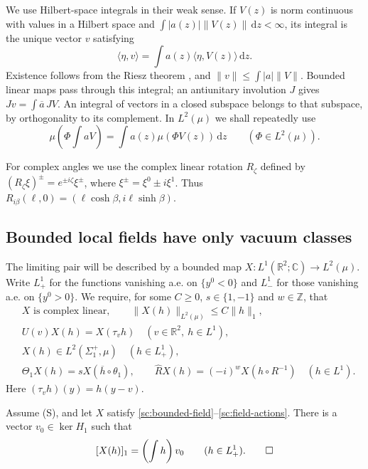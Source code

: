 \documentclass[11pt,letterpaper,reqno]{amsart}
\makeatletter
\theoremstyle{definition}
\newcommand{\ms@minorstart}{%
  \pushQED{\qed}\renewcommand{\qedsymbol}{$\blacksquare$}}
\newenvironment{lemma}[1][]{\ms@minorstart\ms@lemma[#1]}
  {\popQED\endms@lemma}
\theoremstyle{remark}
\newcommand{\R}{\mathbb R}\newcommand{\C}{\mathbb C}
\makeatother
\begin{document}
We use Hilbert-space integrals in their weak sense. If $V(z)$ is norm
continuous with values in a Hilbert space and
$\int|a(z)|\|V(z)\|\,\mathrm dz<\infty$, its integral is the unique vector
$v$ satisfying
\[
\langle\eta,v\rangle=\int a(z)\langle\eta,V(z)\rangle\,\mathrm dz.
\]
Existence follows from the Riesz theorem \cite[Theorem 3.3]{Melrose}, and
$\|v\|\le\int|a|\|V\|$. Bounded linear maps pass through this integral;
an antiunitary involution $J$ gives
$Jv=\int\overline a\,JV$. An integral of vectors in a closed subspace
belongs to that subspace, by orthogonality to its complement. In $L^2(\mu)$
we shall repeatedly use
\begin{equation}\label{sc:integral-pairing}
\mu\left(\Phi\int aV\right)=\int a(z)\mu(\Phi V(z))\,\mathrm dz
\qquad(\Phi\in L^2(\mu)).
\end{equation}

For complex angles we use the complex linear rotation $R_\zeta$ defined by
$(R_\zeta\xi)^\pm=e^{\pm i\zeta}\xi^\pm$, where
$\xi^\pm=\xi^0\pm i\xi^1$. Thus
$R_{i\beta}(\ell,0)=(\ell\cosh\beta,i\ell\sinh\beta)$.

\subsection{Bounded local fields have only vacuum classes}

The limiting pair will be described by a bounded map
$X:L^1(\mathbb R^2;\mathbb C)\to L^2(\mu)$. Write $L^1_+$ for the
functions vanishing a.e. on $\{y^0<0\}$ and $L^1_-$ for those vanishing
a.e. on $\{y^0>0\}$. We require, for some $C\ge0$,
$s\in\{1,-1\}$ and $w\in\mathbb Z$, that
\begin{align}
&X\text{ is complex linear},\qquad \|X(h)\|_{L^2(\mu)}\le C\|h\|_1,
 \label{sc:bounded-field}\\
&U(v)X(h)=X(\tau_vh)\quad(v\in\R^2,\ h\in L^1),
 \label{sc:field-translation}\\
&X(h)\in L^2(\Sigma_1^+,\mu)\quad(h\in L^1_+),
 \label{sc:field-locality}\\
&\Theta_1X(h)=sX(\overline h\circ\theta_1),\qquad
 \hat RX(h)=(-i)^wX(h\circ R^{-1})\quad(h\in L^1).
 \label{sc:field-actions}
\end{align}
Here $(\tau_vh)(y)=h(y-v)$.

\begin{lemma}[Vacuum classes]\label{sc:vacuum-classes}
Assume \textup{(S)}, and let $X$ satisfy
\eqref{sc:bounded-field}--\eqref{sc:field-actions}.
There is a vector $v_0\in\ker H_1$ such that
\[
[X(h)]_1=\left(\int h\right)v_0\qquad(h\in L^1_+).\qedhere
\]
\end{lemma}
\end{document}
